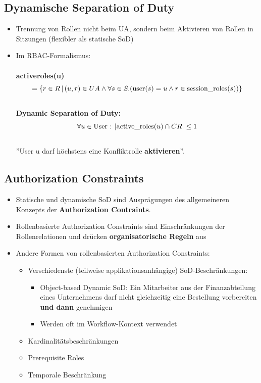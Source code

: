 \documentclass[openany]{book}
\begin{document}
\subsection{Dynamische Separation of Duty}

\begin{itemize}
    \item Trennung von Rollen nicht beim UA, sondern beim Aktivieren von Rollen in Sitzungen (flexibler als statische SoD)
    \item Im RBAC-Formalismus: \\ \\ \textbf{active\textunderscore roles(u)} $$=\{ r\in R\, | \, (u,r)\in UA\wedge \forall s\in S.(\text{user}(s)=u\wedge r\in \text{session\textunderscore roles}(s))\}$$ \\ \textbf{Dynamic Separation of Duty:} \\ $$\forall u \in \text{User}: \, | \text{active\textunderscore roles}(u)\cap CR|\leq 1$$ \\ ''User u darf höchstens eine Konfliktrolle \textbf{aktivieren}''.
\end{itemize}

\subsection{Authorization Constraints}

\begin{itemize}
    \item Statische und dynamische SoD sind Ausprägungen des allgemeineren Konzepts der \textbf{Authorization Contraints}.
    \item Rollenbasierte Authorization Constraints sind Einschränkungen der Rollenrelationen und drücken \textbf{organisatorische Regeln} aus
    \item Andere Formen von rollenbasierten Authorization Constraints:
    \begin{itemize}
        \item Verschiedenste (teilweise applikationsanhängige) SoD-Beschränkungen:
        \begin{itemize}
            \item Object-based Dynamic SoD: Ein Mitarbeiter aus der Finanzabteilung eines Unternehmens darf nicht gleichzeitig eine Bestellung vorbereiten \textbf{und dann} genehmigen
            \item Werden oft im Workflow-Kontext verwendet 
        \end{itemize}
        \item Kardinalitätsbeschränkungen
        \item Prerequisite Roles
        \item Temporale Beschränkung
    \end{itemize}
\end{itemize}
\end{document}
